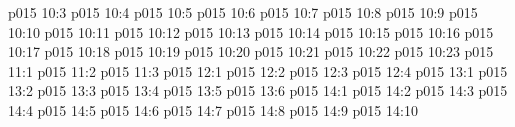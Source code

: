 \vs p015 10:3 \pc 
\vs p015 10:4 
\vs p015 10:5 
\vs p015 10:6 
\vs p015 10:7 
\vs p015 10:8 
\vs p015 10:9 
\vs p015 10:10 
\vs p015 10:11 \pc 
\vs p015 10:12 
\vs p015 10:13 
\vs p015 10:14 
\vs p015 10:15 
\vs p015 10:16 
\vs p015 10:17 
\vs p015 10:18 
\vs p015 10:19 
\vs p015 10:20 
\vs p015 10:21 \pc 
\vs p015 10:22 \pc 
\vs p015 10:23 
\vs p015 11:1 
\vs p015 11:2 
\vs p015 11:3 
\vs p015 12:1 
\vs p015 12:2 
\vs p015 12:3 
\vs p015 12:4 
\vs p015 13:1 
\vs p015 13:2 
\vs p015 13:3 
\vs p015 13:4 \pc 
\vs p015 13:5 
\vs p015 13:6 
\vs p015 14:1 
\vs p015 14:2 
\vs p015 14:3 
\vs p015 14:4 
\vs p015 14:5 \pc 
\vs p015 14:6 
\vs p015 14:7 
\vs p015 14:8 
\vs p015 14:9 \pc 
\vsetoff
\vs p015 14:10 
\quizlink
